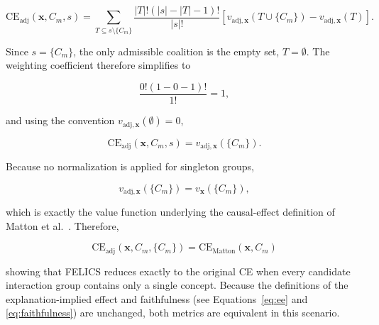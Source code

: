 \begin{math_box}[label=ma:one_item_group]
    \begin{equation}
        \mathrm{CE}_{\mathrm{adj}}(\mathbf{x},C_m,s)
        =
        \sum_{T\subseteq s\setminus\{C_m\}}
        \frac{|T|!(|s|-|T|-1)!}{|s|!}
        \left[
            v_{\mathrm{adj},\mathbf{x}}(T\cup\{C_m\})
            -
            v_{\mathrm{adj},\mathbf{x}}(T)
            \right].
    \end{equation}

    Since $s=\{C_m\}$, the only admissible coalition is the empty set,
    $T=\emptyset$. The weighting coefficient therefore simplifies to

    \begin{equation}
        \frac{0!(1-0-1)!}{1!}=1,
    \end{equation}

    and using the convention $v_{\mathrm{adj},\mathbf{x}}(\emptyset)=0$,

    \begin{equation}
        \mathrm{CE}_{\mathrm{adj}}(\mathbf{x},C_m,s)
        =
        v_{\mathrm{adj},\mathbf{x}}(\{C_m\}).
    \end{equation}

    Because no normalization is applied for singleton groups,

    \begin{equation}
        v_{\mathrm{adj},\mathbf{x}}(\{C_m\})
        =
        v_{\mathbf{x}}(\{C_m\}),
    \end{equation}

    which is exactly the value function underlying the causal-effect definition of Matton et al.~\cite{mattonWalkTalkMeasuring2024}. Therefore,

    \begin{equation}
        \mathrm{CE}_{\mathrm{adj}}(\mathbf{x},C_m,\{C_m\})
        =
        \mathrm{CE}_{\mathrm{Matton}}(\mathbf{x},C_m)
    \end{equation}

    showing that FELICS reduces exactly to the original CE when every candidate interaction group contains only a single concept. Because the definitions of the explanation-implied effect and faithfulness (see Equations~\ref{eq:ee} and \ref{eq:faithfulness}) are unchanged, both metrics are equivalent in this scenario.
\end{math_box}
